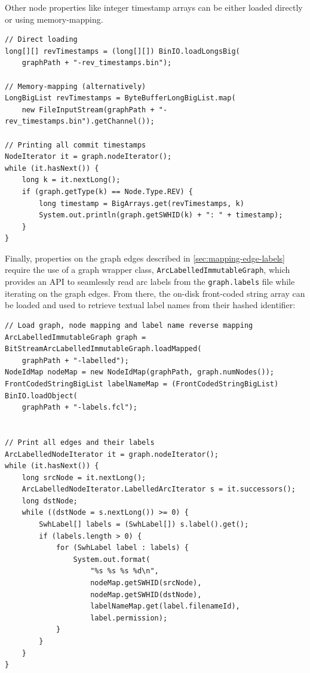 Other node properties like integer timestamp arrays can be either loaded
directly or using memory-mapping.

\begin{verbatim}
// Direct loading
long[][] revTimestamps = (long[][]) BinIO.loadLongsBig(
    graphPath + "-rev_timestamps.bin");

// Memory-mapping (alternatively)
LongBigList revTimestamps = ByteBufferLongBigList.map(
    new FileInputStream(graphPath + "-rev_timestamps.bin").getChannel());

// Printing all commit timestamps
NodeIterator it = graph.nodeIterator();
while (it.hasNext()) {
    long k = it.nextLong();
    if (graph.getType(k) == Node.Type.REV) {
        long timestamp = BigArrays.get(revTimestamps, k)
        System.out.println(graph.getSWHID(k) + ": " + timestamp);
    }
}
\end{verbatim}

Finally, properties on the graph edges described in
\cref{sec:mapping-edge-labels} require the use of a graph wrapper class,
\texttt{ArcLabelledImmutableGraph}, which provides an API to seamlessly read
arc labels from the \texttt{graph.labels} file while iterating on the graph
edges. From there, the on-disk front-coded string array can be loaded and used
to retrieve textual label names from their hashed identifier:

\begin{verbatim}
// Load graph, node mapping and label name reverse mapping
ArcLabelledImmutableGraph graph = BitStreamArcLabelledImmutableGraph.loadMapped(
    graphPath + "-labelled");
NodeIdMap nodeMap = new NodeIdMap(graphPath, graph.numNodes());
FrontCodedStringBigList labelNameMap = (FrontCodedStringBigList) BinIO.loadObject(
    graphPath + "-labels.fcl");


// Print all edges and their labels
ArcLabelledNodeIterator it = graph.nodeIterator();
while (it.hasNext()) {
    long srcNode = it.nextLong();
    ArcLabelledNodeIterator.LabelledArcIterator s = it.successors();
    long dstNode;
    while ((dstNode = s.nextLong()) >= 0) {
        SwhLabel[] labels = (SwhLabel[]) s.label().get();
        if (labels.length > 0) {
            for (SwhLabel label : labels) {
                System.out.format(
                    "%s %s %s %d\n",
                    nodeMap.getSWHID(srcNode),
                    nodeMap.getSWHID(dstNode),
                    labelNameMap.get(label.filenameId),
                    label.permission);
            }
        }
    }
}
\end{verbatim}
